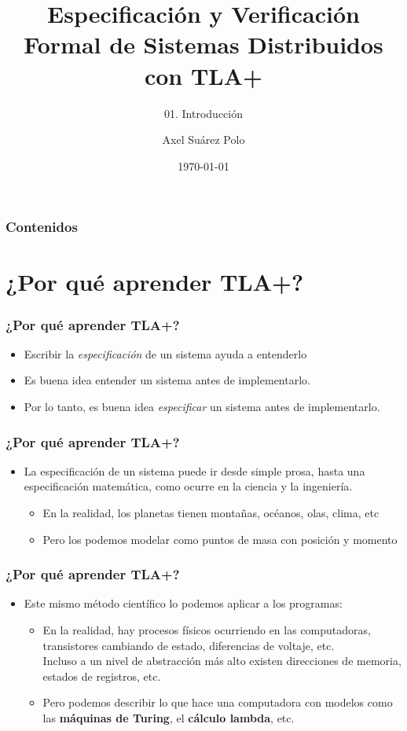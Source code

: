 \documentclass{beamer}
\title{Especificación y Verificación Formal de Sistemas Distribuidos con TLA+}
\subtitle{01. Introducción}
\author{Axel Suárez Polo}
\institute{BUAP}
\date{\today}
\begin{document}
\begin{frame}
  \titlepage
\end{frame}

\begin{frame}[t]
  \frametitle{Contenidos}
  \tableofcontents
\end{frame}

\section{¿Por qué aprender TLA+?}

\begin{frame}
  \frametitle{¿Por qué aprender TLA+?}

  \begin{itemize}
    \item Escribir la \emph{especificación} de un sistema ayuda a entenderlo
    \item Es buena idea entender un sistema antes de implementarlo.
    \item Por lo tanto, es buena idea \emph{especificar} un sistema antes de implementarlo.
  \end{itemize}
\end{frame}

\begin{frame}
  \frametitle{¿Por qué aprender TLA+?}

  \begin{itemize}
    \item La especificación de un sistema puede ir desde simple prosa, hasta
          una especificación matemática, como ocurre en la ciencia y la ingeniería.
          \begin{itemize}
            \item En la realidad, los planetas tienen montañas, océanos, olas, clima, etc
            \item Pero los podemos modelar como puntos de masa con posición y momento
          \end{itemize}
  \end{itemize}
\end{frame}

\begin{frame}
  \frametitle{¿Por qué aprender TLA+?}

  \begin{itemize}
    \item Este mismo método científico lo podemos aplicar a los programas:
          \begin{itemize}
            \item En la realidad, hay procesos físicos ocurriendo en las computadoras,
              transistores cambiando de estado, diferencias de voltaje, etc. \\
              Incluso a un nivel de abstracción más alto existen direcciones de
              memoria, estados de registros, etc.
            \item Pero podemos describir lo que hace una computadora con modelos como las
              \textbf{máquinas de Turing}, el \textbf{cálculo lambda}, etc.
          \end{itemize}
  \end{itemize}
\end{frame}
\end{document}
